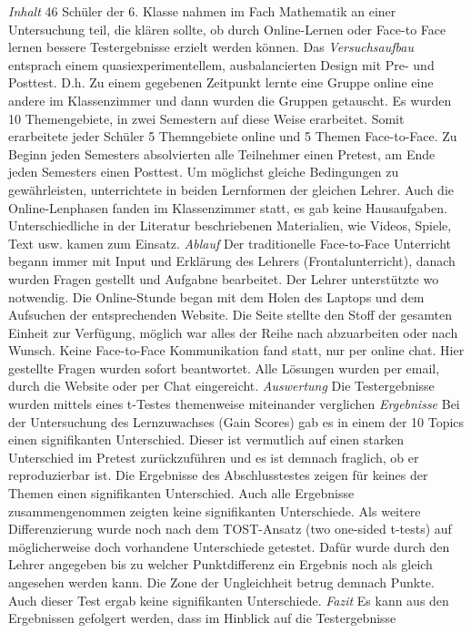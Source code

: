 \documentclass[12pt, bibliography=totoc]{scrartcl}
\begin{document}
\emph{Inhalt} 46 Schüler der 6. Klasse nahmen im Fach Mathematik an
einer Untersuchung teil, die klären sollte, ob durch Online-Lernen oder
Face-to Face lernen bessere Testergebnisse erzielt werden können. Das
\emph{Versuchsaufbau} entsprach einem quasiexperimentellem,
ausbalancierten Design mit Pre- und Posttest. D.h. Zu einem gegebenen
Zeitpunkt lernte eine Gruppe online eine andere im Klassenzimmer und
dann wurden die Gruppen getauscht. Es wurden 10 Themengebiete, in zwei
Semestern auf diese Weise erarbeitet. Somit erarbeitete jeder Schüler 5
Themngebiete online und 5 Themen Face-to-Face. Zu Beginn jeden Semesters
absolvierten alle Teilnehmer einen Pretest, am Ende jeden Semesters
einen Posttest. Um möglichst gleiche Bedingungen zu gewährleisten,
unterrichtete in beiden Lernformen der gleichen Lehrer. Auch die
Online-Lenphasen fanden im Klassenzimmer statt, es gab keine
Hausaufgaben. Unterschiedliche in der Literatur beschriebenen
Materialien, wie Videos, Spiele, Text usw. kamen zum Einsatz.
\emph{Ablauf} Der traditionelle Face-to-Face Unterricht begann immer mit
Input und Erklärung des Lehrers (Frontalunterricht), danach wurden
Fragen gestellt und Aufgabne bearbeitet. Der Lehrer unterstützte wo
notwendig. Die Online-Stunde began mit dem Holen des Laptops und dem
Aufsuchen der entsprechenden Website. Die Seite stellte den Stoff der
gesamten Einheit zur Verfügung, möglich war alles der Reihe nach
abzuarbeiten oder nach Wunsch. Keine Face-to-Face Kommunikation fand
statt, nur per online chat. Hier gestellte Fragen wurden sofort
beantwortet. Alle Lösungen wurden per email, durch die Website oder per
Chat eingereicht. \emph{Auswertung} Die Testergebnisse wurden mittels
eines t-Testes themenweise miteinander verglichen \emph{Ergebnisse} Bei
der Untersuchung des Lernzuwachses (Gain Scores) gab es in einem der 10
Topics einen signifikanten Unterschied. Dieser ist vermutlich auf einen
starken Unterschied im Pretest zurückzuführen und es ist demnach
fraglich, ob er reproduzierbar ist. Die Ergebnisse des Abschlusstestes
zeigen für keines der Themen einen signifikanten Unterschied. Auch alle
Ergebnisse zusammengenommen zeigten keine signifikanten Unterschiede.
Als weitere Differenzierung wurde noch nach dem TOST-Ansatz (two
one-sided t-tests) auf möglicherweise doch vorhandene Unterschiede
getestet. Dafür wurde durch den Lehrer angegeben bis zu welcher
Punktdifferenz ein Ergebnis noch als gleich angesehen werden kann. Die
Zone der Ungleichheit betrug demnach  Punkte. Auch dieser Test
ergab keine signifikanten Unterschiede. \emph{Fazit} Es kann aus den
Ergebnissen gefolgert werden, dass im Hinblick auf die Testergebnisse
\end{document}
